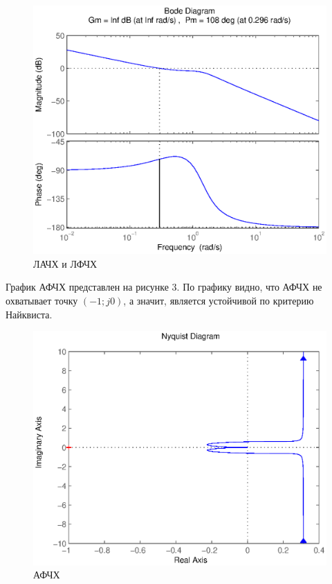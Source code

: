 \documentclass[a4paper, 12pt]{article}
\begin{document}
\newpage
\begin{figure}[h!]
    \centering
    \includegraphics[scale=1.0]{image/bode.eps}
	\caption{ЛАЧХ и ЛФЧХ}
\end{figure}
\par 
График АФЧХ представлен на рисунке 3. По графику видно, что АФЧХ не охватывает точку $(-1; j0)$, а значит, является устойчивой по критерию Найквиста.
    \begin{figure}[h!]
    \centering
	\includegraphics[scale=0.9]{image/nyquist.eps}
    \caption{АФЧХ}
    \end{figure}
\end{document}
